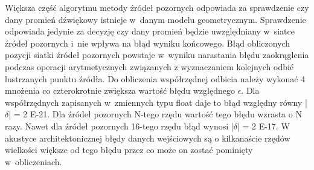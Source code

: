 Większa część algorytmu metody źródeł pozornych odpowiada za sprawdzenie czy dany promień dźwiękowy istnieje w~danym modelu geometrycznym. Sprawdzenie odpowiada jedynie za decyzję czy dany promień będzie uwzględniany w~siatce źródeł pozornych i~nie wpływa na błąd wyniku końcowego. Błąd obliczonych pozycji siatki źródeł pozornych powstaje w~wyniku narastania błędu zaokrąglenia podczas operacji arytmetycznych związanych z wyznaczaniem kolejnych odbić lustrzanych punktu źródła. Do obliczenia współrzędnej odbicia należy wykonać 4 mnożenia co czterokrotnie zwiększa wartość błędu względnego $\epsilon$. Dla współrzędnych zapisanych w~zmiennych typu float daje to błąd względny równy |$\delta$| = 2 E-21. Dla źródeł pozornych N-tego rzędu wartość tego błędu wzrasta o N razy. Nawet dla źródeł pozornych 16-tego rzędu błąd wynosi |$\delta$| = 2 E-17. W akustyce architektonicznej błędy danych wejściowych są o kilkanaście rzędów wielkości większe od tego błędu przez co może on zostać pominięty w~obliczeniach.











